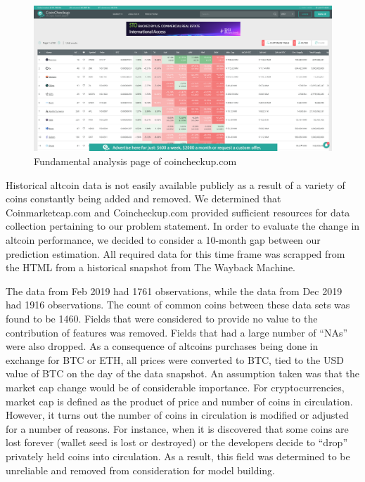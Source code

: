 \documentclass[11pt, english, letterpaper]{article}
\begin{document}
\begin{figure}[!h]
    \centering
    \includegraphics[width=\textwidth]{coincheckup.png}
    \caption{Fundamental analysis page of coincheckup.com}
\end{figure}

Historical altcoin data is not easily available publicly as a result of a variety of  coins constantly being added and removed. We determined that Coinmarketcap.com and Coincheckup.com provided sufficient resources for data collection pertaining to our problem statement. In order to evaluate the change in altcoin performance, we decided to consider a 10-month gap between our prediction estimation. All required data for this time frame was scrapped from the HTML from a historical snapshot from The Wayback Machine.  \par
The data from Feb 2019 had 1761 observations, while the data from Dec 2019 had 1916 observations. The count of common coins between these data sets was found to be 1460.  Fields that were considered to provide no value to the contribution of features was removed. Fields that had a large number of “NAs” were also dropped. As a consequence of altcoins purchases being done in exchange for BTC or ETH, all prices were converted to BTC, tied to the USD value of BTC on the day of the data snapshot. An assumption taken was that the market cap change would be of considerable importance. For cryptocurrencies, market cap is defined as the product of price and number of coins in circulation. However, it turns out the number of coins in circulation is modified or adjusted for a number of reasons. For instance, when it is discovered that some coins are lost forever (wallet seed is lost or destroyed) or the developers decide to “drop” privately held coins into circulation. As a result, this field was determined to be unreliable and removed from consideration for model building.  \par
\end{document}
